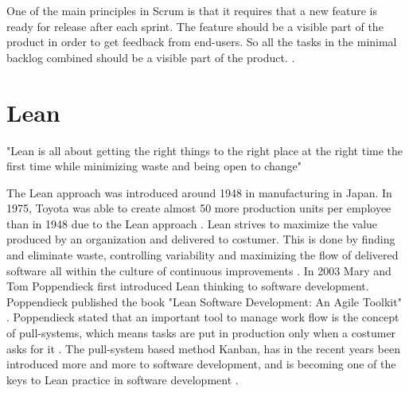 \documentclass[UKenglish]{ifimaster}  %
\begin{document}
One of the main principles in Scrum is that it requires that a new feature is ready for release after each sprint. The feature should be a visible part of the product in order to get feedback from end-users. So all the tasks in the minimal backlog combined should be a visible part of the product.  \parencite{Scrum}.


\section {Lean}
\label{sec:Lean}
"Lean is all about getting the right things to the right place at the right time the first time while minimizing waste and being open to change" \parencite{741480}

The Lean approach was introduced around 1948 in manufacturing in Japan.  In 1975, Toyota was able to create almost 50 more production units per employee than in 1948 due to the Lean approach \parencite{manning}. Lean strives to maximize the value produced by an organization and delivered to costumer. This is done by finding and eliminate waste, controlling variability and maximizing the flow of delivered software all within the culture of continuous improvements \parencite{DavidAnderson}. In 2003 Mary and Tom Poppendieck first introduced Lean thinking to software development. Poppendieck published the book "Lean Software Development: An Agile Toolkit" \parencite{Lean:2003}. Poppendieck stated that an important tool to manage work flow is the concept of pull-systems, which means tasks are put in production only when a costumer asks for it \parencite{Lean:2009}.
The pull-system based method Kanban, has in the recent years been introduced more and more to software development, and is becoming one of the keys to Lean practice in software development \parencite{DavidAnderson}.  
\end{document}
